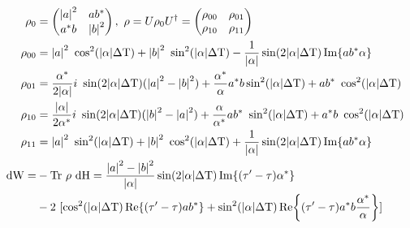 \begin{align}
	\rho_0 & = \begin{pmatrix}
	\abs{a}^2 & a b ^* \\
	a^* b & \abs{b}^2 \\
	\end{pmatrix}, \ \rho = U \rho_0 U^\dagger = 
	\begin{pmatrix}
	\rho_{00} & \rho_{01} \\
	\rho_{10} & \rho_{11} \\
	\end{pmatrix} \nonumber \\
	\rho_{00} & = \abs{a}^2 \ \cos^2(\abs{\alpha} \Delta \mathrm{T}) + \abs{b}^2 \ \sin^2(\abs{\alpha} \Delta \mathrm{T}) - \frac{1}{\abs{\alpha}} \sin(2 \abs{\alpha} \Delta \mathrm{T}) \Im{a b^* \alpha} \nonumber \\
	\rho_{01} & = \frac{\alpha^*}{2 \abs{\alpha}} i \ \sin(2 \abs{\alpha} \Delta \mathrm{T}) (\abs{a}^2 - \abs{b}^2) + \frac{\alpha^*}{\alpha} a^* b \sin^2(\abs{\alpha} \Delta \mathrm{T}) + a b^* \ \cos^2(\abs{\alpha} \Delta \mathrm{T}) \nonumber \\
	\rho_{10} & = 	\frac{\abs{\alpha}}{2 \alpha^*} i \ \sin(2 \abs{\alpha} \Delta \mathrm{T}) (\abs{b}^2 - \abs{a}^2) + \frac{\alpha}{\alpha^*} a b^* \ \sin^2(\abs{\alpha} \Delta \mathrm{T}) + a^* b \ \cos^2(\abs{\alpha} \Delta \mathrm{T}) \nonumber \\
	\rho_{11} & = \abs{a}^2 \ \sin^2(\abs{\alpha} \Delta \mathrm{T}) + \abs{b}^2 \ \cos^2(\abs{\alpha} \Delta \mathrm{T}) + \frac{1}{\abs{\alpha}} \sin(2 \abs{\alpha} \Delta \mathrm{T}) \Im{a b^* \alpha} \nonumber \\
	\mathrm{dW} = & - \mathrm{Tr} \ \rho \ \mathrm{dH} = \frac{\abs{a}^2 - \abs{b}^2}{\abs{\alpha}} \sin(2 \abs{\alpha} \Delta \mathrm{T}) \Im{(\tau' - \tau) \alpha^*} \nonumber \\
	& - 2 \ [\cos^2(\abs{\alpha} \Delta \mathrm{T}) \Re{(\tau' - \tau) a b^*} 
	+ \sin^2(\abs{\alpha} \Delta \mathrm{T}) \Re{(\tau' - \tau)a^* b \frac{\alpha^*}{\alpha}} ] \label{dwformula}
\end{align}